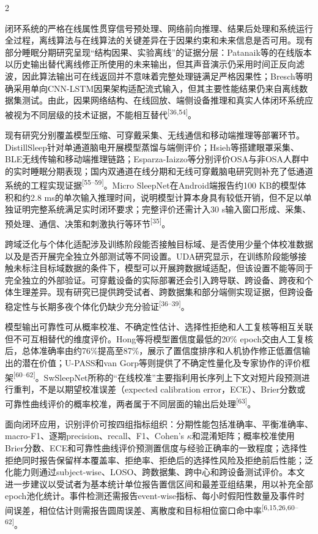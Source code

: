 \documentclass[UTF8,zihao=5,fontset=none]{ctexart}
\newcommand{\song}{\CJKfamily{song}}
\newcommand{\levelthree}[1]{%
  \par\noindent{\song\fontsize{10.5pt}{15.6pt}\selectfont #1}}
\newcommand{\refcite}[1]{\nolinebreak[4]\textsuperscript{[#1]}}
\begin{document}
\begin{multicols}{2}
\levelthree{2.2.5 在线部署、输出可靠性与闭环评价体系}
闭环系统的严格在线属性贯穿信号预处理、网络前向推理、结果后处理和系统运行全过程，离线算法与在线算法的关键差异在于因果约束和未来信息是否可用。现有部分睡眠分期研究呈现“结构因果、实验离线”的证据分层：Patanaik等的在线版本以历史输出替代离线修正所使用的未来输出，但其声音演示仍采用时间正反向滤波，因此算法输出可在线返回并不意味着完整处理链满足严格因果性；Bresch等明确采用单向CNN-LSTM因果架构适配流式输入，但其主要性能结果仍来自离线数据集测试。由此，因果网络结构、在线回放、端侧设备推理和真实人体闭环系统应被视为不同层级的技术证据，不能相互替代\refcite{36,54}。\par

现有研究分别覆盖模型压缩、可穿戴采集、无线通信和移动端推理等部署环节。DistillSleep针对单通道脑电开展模型蒸馏与端侧评价；Hsieh等搭建眼罩采集、BLE无线传输和移动端推理链路；Esparza-Iaizzo等分别评价OSA与非OSA人群中的实时睡眠分期表现；国内双通道在线分期和无线可穿戴脑电研究则补充了低通道系统的工程实现证据\refcite{55--59}。Micro SleepNet在Android端报告约100 KB的模型体积和约2.8 ms的单次输入推理时间，说明模型计算本身具有较低开销，但不足以单独证明完整系统满足实时闭环要求；完整评价还需计入30 s输入窗口形成、采集、预处理、通信、决策和刺激执行等环节\refcite{35}。\par

跨域泛化与个体化适配涉及训练阶段能否接触目标域、是否使用少量个体校准数据以及是否开展完全独立外部测试等不同设置。UDA研究显示，在训练阶段能够接触未标注目标域数据的条件下，模型可以开展跨数据域适配，但该设置不能等同于完全独立的外部验证。可穿戴设备的实际部署还会引入跨导联、跨设备、跨夜和个体生理差异。现有研究已提供跨受试者、跨数据集和部分端侧实现证据，但跨设备稳定性与长期多夜个体化仍缺少充分验证\refcite{36--39}。\par

模型输出可靠性可从概率校准、不确定性估计、选择性拒绝和人工复核等相互关联但不可互相替代的维度评价。Hong等将模型置信度最低的20\% epoch交由人工复核后，总体准确率由约76\%提高至87\%，展示了置信度排序和人机协作修正低置信输出的潜在价值；U-PASS和van Gorp等则提供了不确定性量化及专家协作的评价框架\refcite{60--62}。SwSleepNet所称的“在线校准”主要指利用长序列上下文对短片段预测进行重判，不是以期望校准误差（expected calibration error，ECE）、Brier分数或可靠性曲线评价的概率校准，两者属于不同层面的输出后处理\refcite{63}。\par

面向闭环应用，识别评价可按四组指标组织：分期性能包括准确率、平衡准确率、macro-F1、逐期precision、recall、F1、Cohen's $\kappa$和混淆矩阵；概率校准使用Brier分数、ECE和可靠性曲线评价预测置信度与经验正确率的一致程度；选择性拒绝同时报告保留样本覆盖率、拒绝率、拒绝后的选择性风险及拒绝前后性能；泛化能力则通过subject-wise、LOSO、跨数据集、跨中心和跨设备测试评价。本文进一步建议以受试者为基本统计单位报告置信区间和最差亚组结果，用以补充全部epoch池化统计。事件检测还需报告event-wise指标、每小时假阳性数量及事件时间误差，相位估计则需报告圆周误差、离散度和目标相位窗口命中率\refcite{6,15,26,60--62}。\par


\end{multicols}
\end{document}
